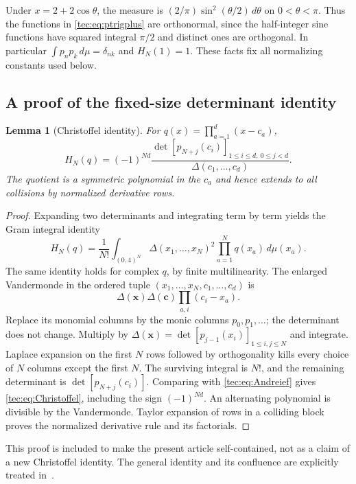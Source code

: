 \documentclass[11pt,a4paper]{article}
\numberwithin{equation}{section}
\newtheorem{lemma}[theorem]{Lemma}
\theoremstyle{definition}
\theoremstyle{remark}
\newcommand{\Del}{\Delta}
\begin{document}
Under $x=2+2\cos\theta$, the measure is
$(2/\pi)\sin^2(\theta/2)\,d\theta$ on $0<\theta<\pi$.
Thus the functions in \eqref{tec:eq:ptrigplus} are orthonormal, since the
half-integer sine functions have squared integral $\pi/2$ and distinct
ones are orthogonal. In particular $\int p_np_k\,d\mu=\delta_{nk}$ and
$H_N(1)=1$. These facts fix all normalizing constants used below.

\subsection{A proof of the fixed-size determinant identity}
\begin{lemma}[Christoffel identity]\label{tec:lem:Christoffel}
For $q(x)=\prod_{a=1}^d(x-c_a)$,
\begin{equation}\label{tec:eq:Christoffel}
 H_N(q)=(-1)^{Nd}
   \frac{\det[p_{N+j}(c_i)]_{1\le i\le d,\ 0\le j<d}}
        {\Del(c_1,\ldots,c_d)}.
\end{equation}
The quotient is a symmetric polynomial in the $c_a$ and hence extends to
all collisions by normalized derivative rows.
\end{lemma}
\begin{proof}
Expanding two determinants and integrating term by term yields the
Gram integral identity
\begin{equation}\label{tec:eq:Andreief}
 H_N(q)=\frac1{N!}\int_{(0,4)^N}\Del(x_1,\ldots,x_N)^2
                 \prod_{a=1}^Nq(x_a)\,d\mu(x_a).
\end{equation}
The same identity holds for complex $q$, by finite multilinearity.
The enlarged Vandermonde in the ordered tuple
$(x_1,\ldots,x_N,c_1,\ldots,c_d)$ is
\[
 \Del(\boldsymbol x)\Del(\boldsymbol c)
            \prod_{a,i}(c_i-x_a).
\]
Replace its monomial columns by the monic columns $p_0,p_1,\ldots$;
the determinant does not change. Multiply by
$\Del(\boldsymbol x)=\det[p_{j-1}(x_i)]_{1\le i,j\le N}$ and integrate.
Laplace expansion on the first $N$ rows followed by orthogonality kills
every choice of $N$ columns except the first $N$. The surviving integral
is $N!$, and the remaining determinant is
$\det[p_{N+j}(c_i)]$. Comparing with \eqref{tec:eq:Andreief} gives
\eqref{tec:eq:Christoffel}, including the sign $(-1)^{Nd}$.
An alternating polynomial is divisible by the Vandermonde. Taylor
expansion of rows in a colliding block proves the normalized derivative
rule and its factorials.
\end{proof}

This proof is included to make the present article self-contained, not
as a claim of a new Christoffel identity. The general identity and its
confluence are explicitly treated in~\cite{Krattenthaler2023}.
\end{document}
